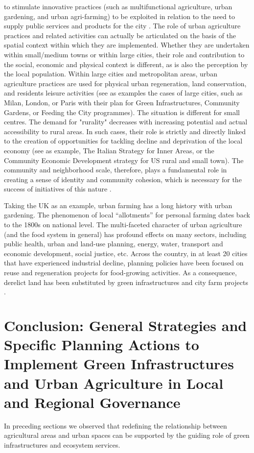 \documentclass[10pt,a4paper]{article}
\begin{document}
\begin{multicols}{2}
to stimulate innovative practices (such as multifunctional agriculture, urban gardening, and urban agri-farming) to be exploited in relation to the need to supply public services and products for the city \citep{r56}. The role of urban agriculture practices and related activities can actually be articulated on the basis of the spatial context within which they are implemented. Whether they are undertaken within small/medium towns or within large cities, their role and contribution to the social, economic and physical context is different, as is also the perception by the local population. Within large cities and metropolitan areas, urban agriculture practices are used for physical urban regeneration, land conservation, and residents leisure activities (see as examples the cases of large cities, such as Milan, London, or Paris with their plan for Green Infrastructures, Community Gardens, or Feeding the City programmes). The situation is different for small centres. The demand for "rurality" decreases with increasing potential and actual accessibility to rural areas. In such cases, their role is strictly and directly linked to the creation of opportunities for tackling decline and deprivation of the local economy (see as example, The Italian Strategy for Inner Areas, or the Community Economic Development strategy for US rural and small town). The community and neighborhood scale, therefore, plays a fundamental role in creating a sense of identity and community cohesion, which is necessary for the success of initiatives of this nature \citep{r57, r58}.

Taking the UK as an example, urban farming has a long history with urban gardening. The phenomenon of local ``allotments'' for personal farming dates back to the 1800s on national level. The multi-faceted character of urban agriculture (and the food system in general) has profound effects on many sectors, including public health, urban and land-use planning, energy, water, transport and economic development, social justice, etc. Across the country, in at least 20 cities that have experienced industrial decline, planning policies have been focused on reuse and regeneration projects for food-growing activities. As a consequence, derelict land has been substituted by green infrastructures and city farm projects \citep{r59, r60}. 

\section{Conclusion: General Strategies and Specific Planning Actions to Implement Green Infrastructures and Urban Agriculture in Local and Regional Governance}
\noindent In preceding sections we observed that redefining the relationship between agricultural areas and urban spaces can be supported by the guiding role of green infrastructures and ecosystem services.


\end{multicols}
\end{document}
